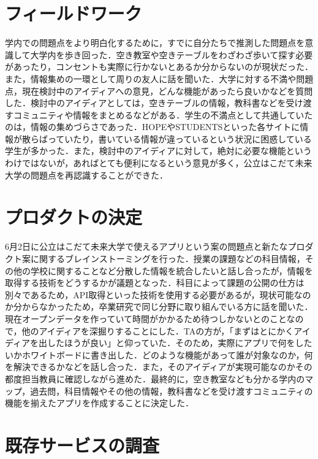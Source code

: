 
\section{フィールドワーク}

学内での問題点をより明白化するために，すでに自分たちで推測した問題点を意識して大学内を歩き回った．空き教室や空きテーブルをわざわざ歩いて探す必要があったり，コンセントも実際に行かないとあるか分からないのが現状だった．また，情報集めの一環として周りの友人に話を聞いた．大学に対する不満や問題点，現在検討中のアイディアへの意見，どんな機能があったら良いかなどを質問した．検討中のアイディアとしては，空きテーブルの情報，教科書などを受け渡すコミュニティや情報をまとめるなどがある．学生の不満点として共通していたのは，情報の集めづらさであった．HOPEやSTUDENTSといった各サイトに情報が散らばっていたり，書いている情報が違っているという状況に困惑している学生が多かった．また，検討中のアイディアに対して，絶対に必要な機能というわけではないが，あればとても便利になるという意見が多く，公立はこだて未来大学の問題点を再認識することができた．



\section{プロダクトの決定}

6月2日に公立はこだて未来大学で使えるアプリという案の問題点と新たなプロダクト案に関するブレインストーミングを行った．授業の課題などの科目情報，その他の学校に関することなど分散した情報を統合したいと話し合ったが，情報を取得する技術をどうするかが議題となった．科目によって課題の公開の仕方は別々であるため，API取得といった技術を使用する必要があるが，現状可能なのか分からなかったため，卒業研究で同じ分野に取り組んでいる方に話を聞いた．現在オープンデータを作っていて時間がかかるため待つしかないとのことなので，他のアイディアを深掘りすることにした．TAの方が，「まずはとにかくアイディアを出したほうが良い」と仰っていた．そのため，実際にアプリで何をしたいかホワイトボードに書き出した．どのような機能があって誰が対象なのか，何を解決できるかなどを話し合った．また，そのアイディアが実現可能なのかその都度担当教員に確認しながら進めた．最終的に，空き教室なども分かる学内のマップ，過去問，科目情報やその他の情報，教科書などを受け渡すコミュニティの機能を揃えたアプリを作成することに決定した．


\section{既存サービスの調査}

